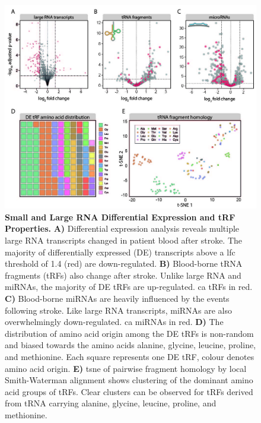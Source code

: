 \begin{figure}[ht]
\includegraphics[width=\textwidth]{figures/stroke-de-tsne}
\caption[Small and Large RNA Differential Expression and tRF Properties.]{\textbf{Small and Large RNA Differential Expression and tRF Properties.} \textbf{A)} Differential expression analysis reveals multiple large RNA transcripts changed in patient blood after stroke. The majority of differentially expressed (DE) transcripts above a \ac{lfc} threshold of 1.4 (red) are down-regulated. \textbf{B)} Blood-borne tRNA fragments (tRFs) also change after stroke. Unlike large RNA and miRNAs, the majority of DE tRFs are up-regulated. \Acf{ca} tRFs in red. \textbf{C)} Blood-borne miRNAs are heavily influenced by the events following stroke. Like large RNA transcripts, miRNAs are also overwhelmingly down-regulated. \Ac{ca} miRNAs in red. \textbf{D)} The distribution of amino acid origin among the DE tRFs is non-random and biased towards the amino acids alanine, glycine, leucine, proline, and methionine. Each square represents one DE tRF, colour denotes amino acid origin. \textbf{E)} \acf{tsne} of pairwise fragment homology by local Smith-Waterman alignment shows clustering of the dominant amino acid groups of tRFs. Clear clusters can be observed for tRFs derived from tRNA carrying alanine, glycine, leucine, proline, and methionine.
\label{fig:stroke-de-tsne}}
\end{figure}

